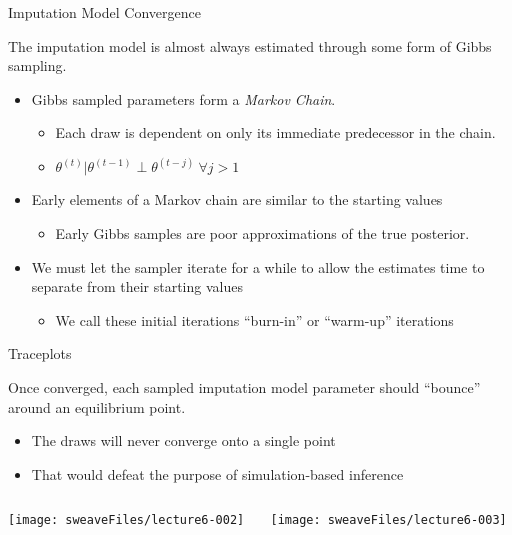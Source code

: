 \documentclass{beamer}
\begin{document}
\begin{frame}{Imputation Model Convergence}
  
  The imputation model is almost always estimated through some form of
  Gibbs sampling.
  \vspace{6pt}
  \begin{itemize}
    \item Gibbs sampled parameters form a \emph{Markov Chain}.
      \begin{itemize}
        \item Each draw is dependent on only its immediate predecessor
          in the chain.
        \item $\theta^{(t)} | \theta^{(t - 1)} \perp \theta^{(t - j)}
          ~ \forall j > 1$
      \end{itemize}
      \vspace{6pt}
    \item Early elements of a Markov chain are similar to the starting
      values
      \begin{itemize}
        \item Early Gibbs samples are poor approximations of the true
          posterior.
      \end{itemize}
      \vspace{6pt}
    \item We must let the sampler iterate for a while to allow the
      estimates time to separate from their starting values
      \begin{itemize}
        \item We call these initial iterations ``burn-in'' or
          ``warm-up'' iterations
      \end{itemize}
  \end{itemize}
  
\end{frame}


\begin{frame}{Traceplots}
  
  Once converged, each sampled imputation model parameter should
  ``bounce'' around an equilibrium point.
  \begin{itemize}
  \item The draws will never converge onto a single point
  \item That would defeat the purpose of simulation-based inference
  \end{itemize}
  
  \begin{columns}
    \begin{column}{0.5\textwidth}
      

\texttt{[image: sweaveFiles/lecture6-002]}

\end{column}

\begin{column}{0.5\textwidth}
  

\texttt{[image: sweaveFiles/lecture6-003]}

\end{column}
\end{columns}

\end{frame}
\end{document}
